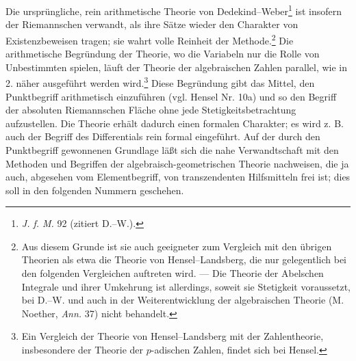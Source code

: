 \documentclass[11pt]{article}
\begin{document}
Die ursprüngliche, rein arithmetische Theorie von Dedekind--Weber\footnote{\emph{J. f. M.} 92 (zitiert D.--W.).} ist insofern der Riemannschen verwandt, als ihre Sätze wieder den Charakter von Existenzbeweisen tragen; sie wahrt volle Reinheit der Methode.\footnote{Aus diesem Grunde ist sie auch geeigneter zum Vergleich mit den übrigen Theorien als etwa die Theorie von Hensel--Landsberg, die nur gelegentlich bei den folgenden Vergleichen auftreten wird. --- Die Theorie der Abelschen Integrale und ihrer Umkehrung ist allerdings, soweit sie Stetigkeit voraussetzt, bei D.--W. und auch in der Weiterentwicklung der algebraischen Theorie (M. Noether, \emph{Ann.} 37) nicht behandelt.} Die arithmetische Begründung der Theorie, wo die Variabeln nur die Rolle von Unbestimmten spielen, läuft der Theorie der algebraischen Zahlen parallel, wie in 2. näher ausgeführt werden wird.\footnote{Ein Vergleich der Theorie von Hensel--Landsberg mit der Zahlentheorie, insbesondere der Theorie der \(p\)-adischen Zahlen, findet sich bei Hensel.} Diese Begründung gibt das Mittel, den Punktbegriff arithmetisch einzuführen (vgl. Hensel Nr. 10a) und so den Begriff der absoluten Riemannschen Fläche ohne jede Stetigkeitsbetrachtung aufzustellen. Die Theorie erhält dadurch einen formalen Charakter; es wird z. B. auch der Begriff des Differentials rein formal eingeführt. Auf der durch den Punktbegriff gewonnenen Grundlage läßt sich die nahe Verwandtschaft mit den Methoden und Begriffen der algebraisch-geometrischen Theorie nachweisen, die ja auch, abgesehen vom Elementbegriff, von transzendenten Hilfsmitteln frei ist; dies soll in den folgenden Nummern geschehen.
\end{document}
